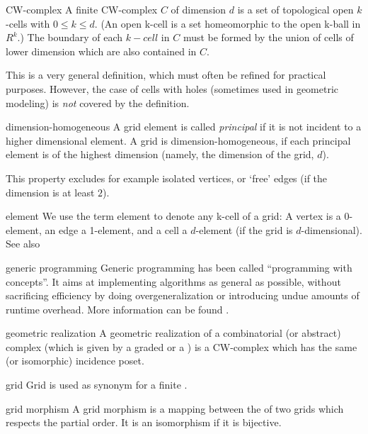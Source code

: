 \begin{Glossar}
\item[CW-complex]
A finite CW-complex $C$ of dimension $d$ 
is a set of topological open $k$-cells with $0 \leq k \leq d$.
(An open k-cell is a set homeomorphic to the open k-ball in $R^k$.)
The boundary of each $k-cell$ in $C$ must be formed by
the union of cells of lower dimension
which are also contained in $C$.

This is a very general definition, which must often be refined
for practical purposes.
However, the case of cells with holes (sometimes used in geometric modeling)
is \emph{not\/} covered by the definition.

\item[dimension-homogeneous]
  A grid element is called {\sl principal\/} if it is not incident to a higher dimensional element.
   A grid is dimension-homogeneous, if each principal element is of
   the highest dimension (namely, the dimension of the grid, $d$).

   This property excludes for example isolated vertices,
   or `free' edges (if the dimension is at least $2$).

\item[element]
We use the term element to denote any k-cell of a grid:
A vertex is a 0-element, an edge a 1-element, and a cell a $d$-element
(if the grid is $d$-dimensional). 
See also 

\item[generic programming]
Generic programming has been called ``programming with concepts''.
It aims at implementing algorithms as general as possible, 
without sacrificing efficiency by doing overgeneralization or
introducing undue amounts of runtime overhead.
More information can be found .

\item[geometric realization]
A geometric realization of a combinatorial (or abstract) complex
(which is given by a graded  or a )
is a CW-complex which has the same (or isomorphic) 
incidence poset.


\item[grid]
Grid is used as synonym for a 
finite 
.

\item[grid morphism]
A grid morphism is a mapping between the 
 of two grids
which respects the partial order.
It is an isomorphism if it is bijective.


\end{Glossar}
